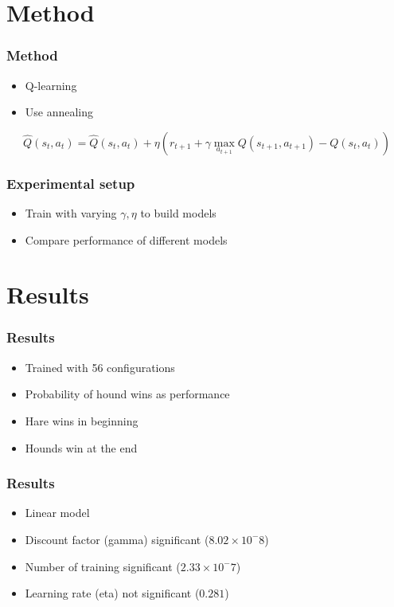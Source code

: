 \documentclass{beamer}
\begin{document}
\section{Method}
\begin{frame}
	\frametitle{Method}
	\begin{itemize}
		\item Q-learning
		\item Use annealing
	\end{itemize}
	\[ \hat{Q}(s_t, a_t) = \hat{Q}(s_t, a_t) + \eta \left(r_{t+1} + \gamma \max_{a_{t+1}} Q(s_{t+1}, a_{t+1}) - Q(s_t, a_t)\right) \]
\end{frame}

\begin{frame}
	\frametitle{Experimental setup}
	\begin{itemize}
		\item Train with varying $\gamma, \eta$ to build models
		\item Compare performance of different models
	\end{itemize}
\end{frame}

\section{Results}
\begin{frame}
    \frametitle{Results}
    \begin{itemize}
        \item Trained with 56 configurations
        \item Probability of hound wins as performance

            \phantom{M}

        \item Hare wins in beginning
        \item Hounds win at the end
    \end{itemize}
\end{frame}

\begin{frame}
    \frametitle{Results}
    \begin{itemize}
        \item Linear model
        \item Discount factor (gamma) significant ($8.02 \times 10^-8$)
        \item Number of training significant ($2.33 \times 10^-7$)
        \item Learning rate (eta) not significant ($0.281$)
    \end{itemize}
\end{frame}
\end{document}
